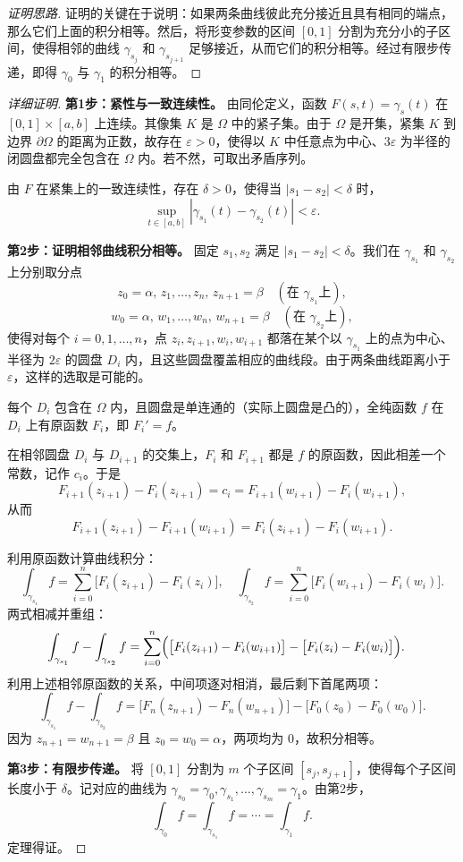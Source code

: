 \documentclass[UTF8]{ctexart}
\numberwithin{equation}{section}
\begin{document}
\begin{proof}[证明思路]
证明的关键在于说明：如果两条曲线彼此充分接近且具有相同的端点，那么它们上面的积分相等。然后，将形变参数的区间 $[0,1]$ 分割为充分小的子区间，使得相邻的曲线 $\gamma_{s_j}$ 和 $\gamma_{s_{j+1}}$ 足够接近，从而它们的积分相等。经过有限步传递，即得 $\gamma_0$ 与 $\gamma_1$ 的积分相等。
\end{proof}

\begin{proof}[详细证明]
\textbf{第1步：紧性与一致连续性。}
由同伦定义，函数 $F(s,t)=\gamma_s(t)$ 在 $[0,1]\times[a,b]$ 上连续。其像集 $K$ 是 $\Omega$ 中的紧子集。由于 $\Omega$ 是开集，紧集 $K$ 到边界 $\partial\Omega$ 的距离为正数，故存在 $\varepsilon>0$，使得以 $K$ 中任意点为中心、$3\varepsilon$ 为半径的闭圆盘都完全包含在 $\Omega$ 内。若不然，可取出矛盾序列。

由 $F$ 在紧集上的一致连续性，存在 $\delta>0$，使得当 $|s_1-s_2|<\delta$ 时，
\[
\sup_{t\in[a,b]} |\gamma_{s_1}(t)-\gamma_{s_2}(t)| < \varepsilon .
\]

\textbf{第2步：证明相邻曲线积分相等。}
固定 $s_1,s_2$ 满足 $|s_1-s_2|<\delta$。我们在 $\gamma_{s_1}$ 和 $\gamma_{s_2}$ 上分别取分点
\[
z_0=\alpha,\,z_1,\dots,z_n,\,z_{n+1}=\beta \quad (\text{在 }\gamma_{s_1}\text{上}),
\]
\[
w_0=\alpha,\,w_1,\dots,w_n,\,w_{n+1}=\beta \quad (\text{在 }\gamma_{s_2}\text{上}),
\]
使得对每个 $i=0,1,\dots,n$，点 $z_i,z_{i+1},w_i,w_{i+1}$ 都落在某个以 $\gamma_{s_1}$ 上的点为中心、半径为 $2\varepsilon$ 的圆盘 $D_i$ 内，且这些圆盘覆盖相应的曲线段。由于两条曲线距离小于 $\varepsilon$，这样的选取是可能的。

每个 $D_i$ 包含在 $\Omega$ 内，且圆盘是单连通的（实际上圆盘是凸的），全纯函数 $f$ 在 $D_i$ 上有原函数 $F_i$，即 $F_i'=f$。

在相邻圆盘 $D_i$ 与 $D_{i+1}$ 的交集上，$F_i$ 和 $F_{i+1}$ 都是 $f$ 的原函数，因此相差一个常数，记作 $c_i$。于是
\[
F_{i+1}(z_{i+1})-F_i(z_{i+1}) = c_i = F_{i+1}(w_{i+1})-F_i(w_{i+1}),
\]
从而
\[
F_{i+1}(z_{i+1})-F_{i+1}(w_{i+1}) = F_i(z_{i+1})-F_i(w_{i+1}).
\]

利用原函数计算曲线积分：
\[
\int_{\gamma_{s_1}} f = \sum_{i=0}^n \bigl[F_i(z_{i+1}) - F_i(z_i)\bigr],\quad
\int_{\gamma_{s_2}} f = \sum_{i=0}^n \bigl[F_i(w_{i+1}) - F_i(w_i)\bigr].
\]
两式相减并重组：
\[
\begin{aligned}
\int_{\gamma_{s_1}} f - \int_{\gamma_{s_2}} f 
&= \sum_{i=0}^n \Bigl( \bigl[F_i(z_{i+1})-F_i(w_{i+1})\bigr] - \bigl[F_i(z_i)-F_i(w_i)\bigr] \Bigr).
\end{aligned}
\]
利用上述相邻原函数的关系，中间项逐对相消，最后剩下首尾两项：
\[
\int_{\gamma_{s_1}} f - \int_{\gamma_{s_2}} f 
= \bigl[F_n(z_{n+1})-F_n(w_{n+1})\bigr] - \bigl[F_0(z_0)-F_0(w_0)\bigr].
\]
因为 $z_{n+1}=w_{n+1}=\beta$ 且 $z_0=w_0=\alpha$，两项均为 $0$，故积分相等。

\textbf{第3步：有限步传递。}
将 $[0,1]$ 分割为 $m$ 个子区间 $[s_j,s_{j+1}]$，使得每个子区间长度小于 $\delta$。记对应的曲线为 $\gamma_{s_0}=\gamma_0,\gamma_{s_1},\dots,\gamma_{s_m}=\gamma_1$。由第2步，
\[
\int_{\gamma_0} f = \int_{\gamma_{s_1}} f = \cdots = \int_{\gamma_1} f .
\]
定理得证。
\end{proof}
\end{document}
